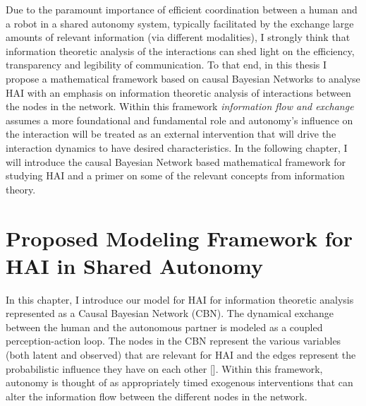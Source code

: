 \documentclass[12pt]{article}
\newcommand{\DGc}[1]{{\textbf{\color{blue}{#1}}}}
\begin{document}
Due to the paramount importance of efficient coordination between a human and a robot in a shared autonomy system, typically facilitated by the exchange large amounts of relevant information (via different modalities), I strongly think that information theoretic analysis of the interactions can shed light on the efficiency, transparency and legibility of communication. To that end, in this thesis I propose a mathematical framework based on causal Bayesian Networks to analyse HAI 
with an emphasis on information theoretic analysis of interactions between the nodes in the network. Within this framework \textit{information flow and exchange} assumes a more foundational and fundamental role and autonomy's influence on the interaction will be treated as an external intervention that will drive the interaction dynamics to have desired characteristics. In the following chapter, I will introduce the causal Bayesian Network based mathematical framework for studying HAI and a primer on some of the relevant concepts from information theory. 

% 
%
%
%

%
%
%
%

\pagebreak
\section{Proposed Modeling Framework for HAI in Shared Autonomy}
In this chapter, I introduce our model for HAI for information theoretic analysis represented as a Causal Bayesian Network (CBN). The dynamical exchange between the human and the autonomous partner is modeled as a coupled perception-action loop. The nodes in the CBN represent the various variables (both latent and observed) that are relevant for HAI and the edges represent the probabilistic influence they have on each other []. Within this framework, autonomy is thought of as appropriately timed exogenous interventions that can alter the information flow between the different nodes in the network.
\end{document}
